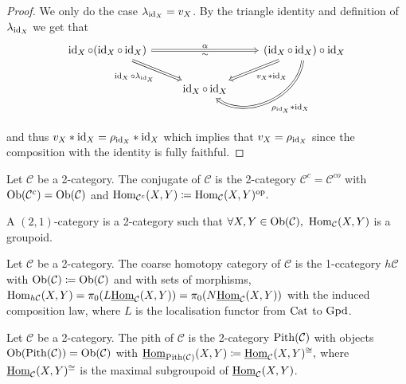 \begin{proof}
	We only do the case $ \lambda_{\operatorname{id}_X}= v_X $.
	By the triangle identity and definition of $ \lambda_{ \operatorname{id}_X} $
	we get that 
	\[
	\begin{tikzcd}	
		\id_X \circ ( \id_X \circ \id_X )
		\ar[rr, Rightarrow, "\alpha", "\sim"']
		\ar[rd, Rightarrow, "\id_X \circ \lambda_{ \id_X}"']
		&&
		(\id_X \circ \id_X ) \circ \id_X
		\ar[dl, Rightarrow," v_X * \id_X"]
		\ar[dl, Rightarrow, bend left=60, " \rho_{\id_X} * \id_X"]
		\\
		&
		\id_X \circ \id_X
	\end{tikzcd}	
	\]
	and thus $ v_X * \operatorname{id}_X = \rho_{\operatorname{id}_X} * \operatorname{id}_X$ which implies that $v_X = \rho_{ \operatorname{id}_X}$ since the composition with the identity is fully faithful.
\end{proof}

\begin{defi}
	Let $\mathcal{ C }$ be a 2-category. The conjugate of $\mathcal{ C } $ is the 2-category $ \mathcal{C}^c = \mathcal{ C }^{co} $ with $\operatorname{Ob}( \mathcal{ C }^c ) = \operatorname{Ob} ( \mathcal{ C } )$ and $ \operatorname{Hom}_{ \mathcal{ C }^c} ( X , Y ) \coloneqq \operatorname{Hom}_{ \mathcal{ C } } ( X , Y )^{ \operatorname{op}}.$
\end{defi}

\begin{defi}
	A $ ( 2 ,1 )$-category is a 2-category such that $ \forall X, Y \in \operatorname{Ob} ( \mathcal{ C } ) , $
	$ \operatorname{Hom}_{ \mathcal{ C } } (X , Y) $ is a groupoid.
\end{defi}

\begin{defi}
	Let $ \mathcal{ C } $ be a 2-category. The coarse homotopy category of $\mathcal{C}$ is the 1-ccategory $h\mathcal{C}$ with $\operatorname{Ob} ( \mathcal{C } ) \coloneqq \operatorname{Ob}(\mathcal{ C } ) $ and with sets of morphisms, $ \operatorname{Hom}_{ h \mathcal{ C } }  ( X , Y ) = \pi_0 ( L \underline{ \operatorname{Hom} }_{ \mathcal{ C } } ( X , Y )) = \pi_0 ( N \underline{\operatorname{Hom}}_{\mathcal{ C } }( X , Y ))$ with the induced composition law, where $L$  is the localisation functor from $ \operatorname{Cat} $ to $\operatorname{Gpd}$.
\end{defi}

\begin{defi}
	Let $\mathcal{ C }$ be a 2-category.
	The pith of $ \mathcal{ C } $ is the 2-category $ \operatorname{Pith} ( \mathcal{ C } )$ with objects $ \operatorname{Ob} ( \operatorname{Pith} ( \mathcal{ C } ) )=\operatorname{Ob} ( \mathcal{ C } )$ with $\underline{ \operatorname{Hom} }_{ \operatorname{Pith} ( \mathcal{ C } ) } ( X, Y ) \coloneqq \underline{\operatorname{Hom}}_{ \mathcal{ C } } ( X , Y )^{ \cong } , $ where $ \underline{\operatorname{Hom}}_{ \mathcal{ C } } ( X , Y )^{ \cong } $ is the maximal subgroupoid of $\underline{\operatorname{Hom}}_{ \mathcal{ C } } ( X , Y ) $.
\end{defi}


